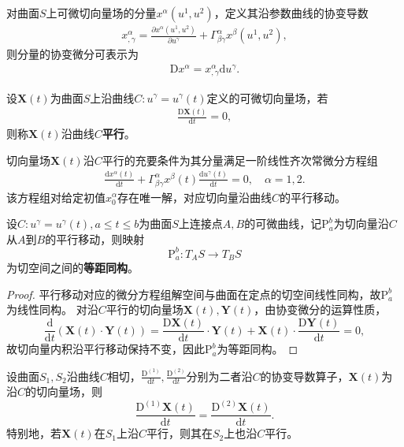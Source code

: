 \documentclass[../../main.tex]{subfiles}%
\begin{document}
对曲面$S$上可微切向量场的分量$x^\alpha(u^1,u^2)$，定义其沿参数曲线的协变导数
\begin{align*}
x^\alpha_{,\gamma}=\frac{\partial x^\alpha(u^1,u^2)}{\partial u^\gamma}+\Gamma_{\beta\gamma}^\alpha x^\beta(u^1,u^2),
\end{align*}
则分量的协变微分可表示为
\begin{align*}
\mathrm{D}x^\alpha=x^\alpha_{,\gamma}\mathrm{d}u^\gamma.
\end{align*}

\begin{definition}
设$\boldsymbol{X}(t)$为曲面$S$上沿曲线$C:u^\gamma=u^\gamma(t)$定义的可微切向量场，若
\begin{align}
\frac{\mathrm{D}\boldsymbol{X}(t)}{\mathrm{d}t}=0,
\label{eq:parallel_def}
\end{align}
则称$\boldsymbol{X}(t)$沿曲线$C$\textbf{{平行}}。
\end{definition}

\begin{remark}
切向量场$\boldsymbol{X}(t)$沿$C$平行的充要条件为其分量满足一阶线性齐次常微分方程组
\begin{align}
\frac{\mathrm{d}x^\alpha(t)}{\mathrm{d}t}+\Gamma_{\beta\gamma}^\alpha x^\beta(t)\frac{\mathrm{d}u^\gamma(t)}{\mathrm{d}t}=0,\quad \alpha=1,2.
\label{eq:parallel_ode}
\end{align}
该方程组对给定初值$x_0^\alpha$存在唯一解，对应切向量沿曲线$C$的平行移动。
\end{remark}

\begin{theorem}
设$C:u^\gamma=u^\gamma(t),a\leqslant t\leqslant b$为曲面$S$上连接点$A,B$的可微曲线，记$\mathrm{P}_a^b$为切向量沿$C$从$A$到$B$的平行移动，则映射
\[
\mathrm{P}_a^b:T_A S\to T_B S
\]
为切空间之间的\textbf{等距同构}。
\end{theorem}

\begin{proof}
平行移动对应的微分方程组解空间与曲面在定点的切空间线性同构，故$\mathrm{P}_a^b$为线性同构。
对沿$C$平行的切向量场$\boldsymbol{X}(t),\boldsymbol{Y}(t)$，由协变微分的运算性质，
\[
\frac{\mathrm{d}}{\mathrm{d}t}(\boldsymbol{X}(t)\cdot\boldsymbol{Y}(t))=\frac{\mathrm{D}\boldsymbol{X}(t)}{\mathrm{d}t}\cdot\boldsymbol{Y}(t)+\boldsymbol{X}(t)\cdot\frac{\mathrm{D}\boldsymbol{Y}(t)}{\mathrm{d}t}=0,
\]
故切向量内积沿平行移动保持不变，因此$\mathrm{P}_a^b$为等距同构。
\end{proof}

\begin{theorem}
设曲面$S_1,S_2$沿曲线$C$相切，$\frac{\mathrm{D}^{(1)}}{\mathrm{d}t},\frac{\mathrm{D}^{(2)}}{\mathrm{d}t}$分别为二者沿$C$的协变导数算子，$\boldsymbol{X}(t)$为沿$C$的切向量场，则
\[
\frac{\mathrm{D}^{(1)}\boldsymbol{X}(t)}{\mathrm{d}t}=\frac{\mathrm{D}^{(2)}\boldsymbol{X}(t)}{\mathrm{d}t}.
\]
特别地，若$\boldsymbol{X}(t)$在$S_1$上沿$C$平行，则其在$S_2$上也沿$C$平行。
\end{theorem}
\end{document}

